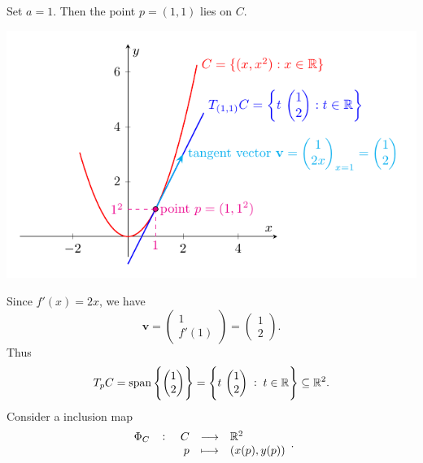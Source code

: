 \documentclass[11pt,openany]{article}
\renewcommand{\vec}[1]{\mathbf{#1}}
\begin{document}
Set \(a=1\).  Then the point \(p=(1,1)\) lies on \(C\). 
\begin{center}
	\includegraphics[scale=1]{tangent-space-example-2.pdf}
\end{center}
Since \(f'(x)=2x\), we have
\[
\vec v=\begin{pmatrix}1\\f'(1)\end{pmatrix}=\begin{pmatrix}1\\2\end{pmatrix}.
\] Thus
\[
T_pC
=\mathrm{span}\set{\begin{pmatrix}
1\\ 2
\end{pmatrix}}=\set{t\,\begin{pmatrix}1\\ 2\end{pmatrix}\;:\;t\in\mathbb{R}}
\subseteq\mathbb{R}^2.
\]
\newpage\noindent
Consider a inclusion map \[
\fullfunction{\Phi_C}{C}{\R^2}{p}{(x(p), y(p))}.
\]
\end{document}
